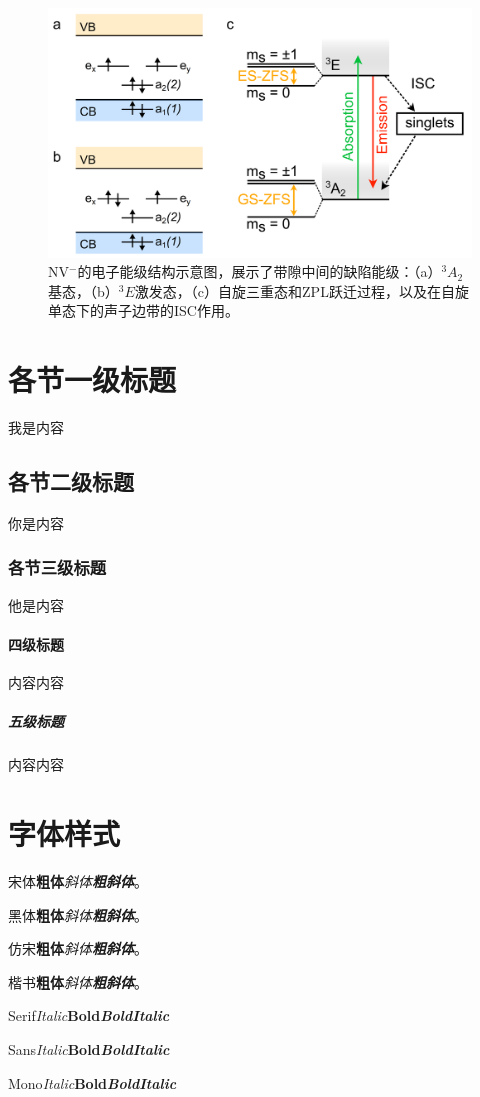 \documentclass[type = bachelor]{whu-thesis}
\begin{document}
\begin{figure}
  \centering
  \includegraphics[width=1.0\textwidth]{figures/Chapter 1/Electronic Structure.png}
  \caption{NV$^-$的电子能级结构示意图，展示了带隙中间的缺陷能级：（a）$^3A_2$基态，（b）$^3E$激发态，（c）自旋三重态和ZPL跃迁过程，以及在自旋单态下的声子边带的ISC作用。}
  \label{fig:NV Spectrum}
\end{figure}


\section{各节一级标题}
我是内容

\subsection{各节二级标题}
你是内容

\subsubsection{各节三级标题}
他是内容

\paragraph{四级标题}
内容内容

\subparagraph{五级标题}
内容内容

\section{字体样式}
宋体\quad \textbf{粗体}\quad \textit{斜体}\quad \textbf{\textit{粗斜体}}。

{\heiti 黑体\quad \textbf{粗体}\quad \textit{斜体}\quad \textbf{\textit{粗斜体}}}。

{\fangsong 仿宋\quad \textbf{粗体}\quad \textit{斜体}\quad \textbf{\textit{粗斜体}}}。

{\kaishu 楷书\quad \textbf{粗体}\quad \textit{斜体}\quad \textbf{\textit{粗斜体}}}。

Serif\quad \textit{Italic}\quad \textbf{Bold}\quad \textbf{\textit{BoldItalic}}

{\sffamily Sans\quad \textit{Italic}\quad \textbf{Bold}\quad \textbf{\textit{BoldItalic}}}

{\ttfamily Mono\quad \textit{Italic}\quad \textbf{Bold}\quad \textbf{\textit{BoldItalic}}}
\end{document}
